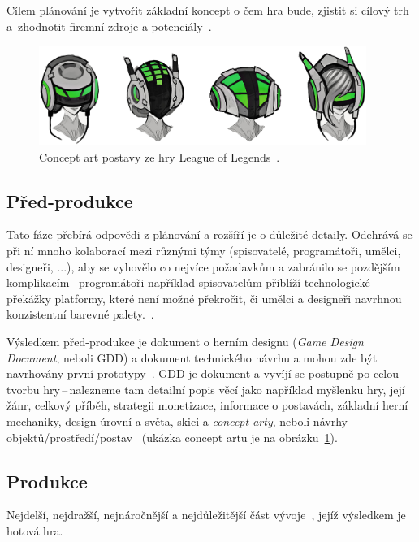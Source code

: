 Cílem plánování je vytvořit základní koncept o čem hra bude, zjistit si cílový trh a~zhodnotit firemní zdroje a potenciály~\cite{novak2011game}.

\begin{figure}[hb]
    \centering
	\includegraphics[width=0.95\textwidth]{obrazky-figures/ch2/concept_art.png}
	\caption{Concept art postavy ze hry League of Legends~\cite{artLOLvol1}.}
	\label{fig:concept_art_lol}
\end{figure}

\subsection*{Před-produkce}
Tato fáze přebírá odpovědi z plánování a rozšíří je o důležité detaily. Odehrává se při ní mnoho kolaborací mezi různými týmy (spisovatelé, programátoři, umělci, designeři, ...), aby se vyhovělo co nejvíce požadavkům a zabránilo se pozdějším komplikacím\,--\,programátoři například spisovatelům přiblíží technologické překážky platformy, které není možné překročit, či umělci a designeři navrhnou konzistentní barevné palety.~\cite{g2_game_development}.

Výsledkem před-produkce je dokument o herním designu (\textit{Game Design Document}, neboli GDD) a dokument technického návrhu a mohou zde být navrhovány první prototypy~\cite{novak2011game}. GDD je  dokument a vyvíjí se postupně po celou tvorbu hry\,--\,nalezneme tam detailní popis věcí jako například myšlenku hry, její žánr, celkový příběh, strategii monetizace, informace o postavách, základní herní mechaniky, design úrovní a světa, skici a \textit{concept arty}, neboli návrhy objektů/prostředí/postav~\cite{CG_Spectrum_GAMEDEVELOPMENT} (ukázka concept artu je na obrázku~\ref{fig:concept_art_lol}).

\subsection*{Produkce}
Nejdelší, nejdražší, nejnáročnější a nejdůležitější část vývoje~\cite{g2_game_development}, jejíž výsledkem je hotová hra. 

